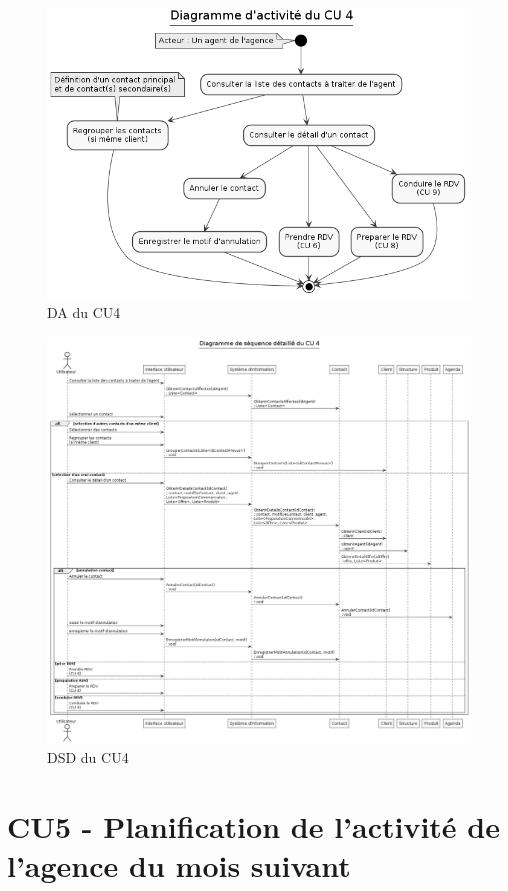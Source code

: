 \begin{figure}[H]
\centering
\includegraphics[width=\textwidth]{figures/DA_CU4.png}
\caption{DA du CU4}
\end{figure}

\begin{figure}[H]
\centering
\includegraphics[width=\textwidth]{figures/DSD_CU4.png}
\caption{DSD du CU4}
\end{figure}

\clearpage
\section{CU5 - Planification de l’activité de l’agence du mois suivant}

